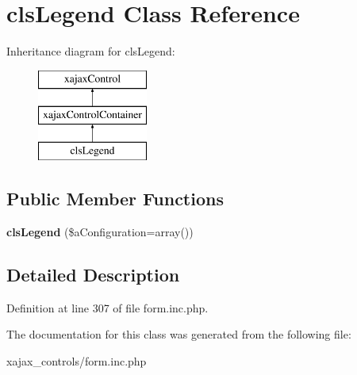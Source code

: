 \hypertarget{classclsLegend}{
\section{clsLegend Class Reference}
\label{classclsLegend}
}
Inheritance diagram for clsLegend:\begin{figure}[H]
\begin{center}
\leavevmode
\includegraphics[height=3.000000cm]{classclsLegend}
\end{center}
\end{figure}
\subsection*{Public Member Functions}
\begin{DoxyCompactItemize}
\item 
\hypertarget{classclsLegend_a0de459add858edee6422bd3f0fa9a833}{
{\bfseries clsLegend} (\$aConfiguration=array())}
\label{classclsLegend_a0de459add858edee6422bd3f0fa9a833}

\end{DoxyCompactItemize}


\subsection{Detailed Description}


Definition at line 307 of file form.inc.php.



The documentation for this class was generated from the following file:\begin{DoxyCompactItemize}
\item 
xajax\_\-controls/form.inc.php\end{DoxyCompactItemize}
